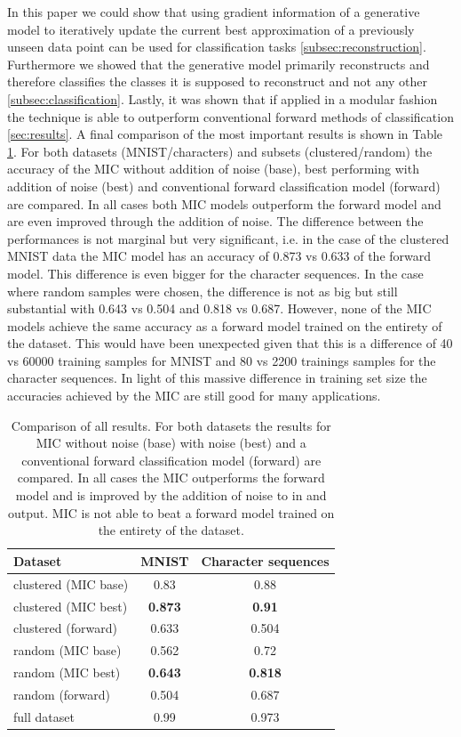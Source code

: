 \documentclass{article}
\begin{document}
In this paper we could show that using gradient information of a generative model to iteratively update the current best approximation of a previously unseen data point can be used for classification tasks \ref{subsec:reconstruction}. Furthermore we showed that the generative model primarily reconstructs and therefore classifies the classes it is supposed to reconstruct and not any other \ref{subsec:classification}. Lastly, it was shown that if applied in a modular fashion the technique is able to outperform conventional forward methods of classification \ref{sec:results}.
A final comparison of the most important results is shown in Table \ref{table:final_comparison}. For both datasets (MNIST/characters) and subsets (clustered/random) the accuracy of the MIC without addition of noise (base), best performing with addition of noise (best) and conventional forward classification model (forward) are compared. In all cases both MIC models outperform the forward model and are even improved through the addition of noise. The difference between the performances is not marginal but very significant, i.e. in the case of the clustered MNIST data the MIC model has an accuracy of 0.873 vs 0.633 of the forward model. This difference is even bigger for the character sequences. In the case where random samples were chosen, the difference is not as big but still substantial with 0.643 vs 0.504 and 0.818 vs 0.687. However, none of the MIC models achieve the same accuracy as a forward model trained on the entirety of the dataset. This would have been unexpected given that this is a difference of 40 vs 60000 training samples for MNIST and 80 vs 2200 trainings samples for the character sequences. In light of this massive difference in training set size the accuracies achieved by the MIC are still good for many applications. 

\begin{table}[!htb]
	\centering
	\caption{Comparison of all results. For both datasets the results for MIC without noise (base) with noise (best) and a conventional forward classification model (forward) are compared. In all cases the MIC outperforms the forward model and is improved by the addition of noise to in and output. MIC is not able to beat a forward model trained on the entirety of the dataset.}
	\begin{tabular}{l|cc}
		\toprule
		Dataset &  MNIST & Character sequences \\
		\midrule
		clustered (MIC base) & 0.83 & 0.88 \\
		clustered (MIC best) & \textbf{0.873} & \textbf{0.91} \\
		clustered (forward) & 0.633 & 0.504 \\
		\hdashline
		random (MIC base) & 0.562 & 0.72 \\
		random (MIC best) & \textbf{0.643} & \textbf{0.818} \\
		random (forward) & 0.504 & 0.687 \\
		\hdashline 
		full dataset & 0.99 & 0.973 \\
		\bottomrule
	\end{tabular}
	\label{table:final_comparison}
\end{table}
\end{document}
